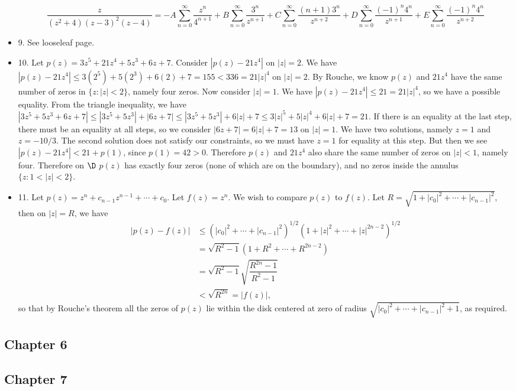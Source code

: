 \documentclass[11pt]{book}
\theoremstyle{definition}
\begin{document}
\begin{itemize}
\[
\dfrac{z}{(z^2+4)(z-3)^2(z-4)} =-A\sum_{n=0}^\infty \dfrac{z^n}{4^{n+1}}+ B\sum_{n=0}^\infty \dfrac{3^n}{z^{n+1}}+ C\sum_{n=0}^\infty\dfrac{(n+1)3^n}{z^{n+2}}+D\sum_{n=0}^\infty \dfrac{(-1)^n4^n}{z^{n+1}}+E\sum_{n=0}^\infty \dfrac{(-1)^n4^n}{z^{n+2}}
\]
\item 9. See looseleaf page.
\item 10. Let $p(z)=3z^5 +21z^4 +5z^3+6z +7$. Consider $|p(z)-21z^4|$ on $|z|=2$. We have $|p(z)-21z^4|\leq 3(2^5)+5(2^3)+6(2)+7=155<336=21|z|^4$ on $|z|=2$. By Rouche, we know $p(z)$ and $21z^4$ have the same number of zeros in $\{z:|z|<2\}$, namely four zeros. Now consider $|z|=1$. We have $|p(z)-21z^4|\leq 21=21|z|^4$, so we have a possible equality. From the triangle inequality, we have $|3z^5+5z^3+6z+7|\leq |3z^5+5z^3|+|6z+7|\leq |3z^5+5z^3|+6|z|+7\leq 3|z|^5+5|z|^4+6|z|+7=21$. If there is an equality at the last step, there must be an equality at all steps, so we consider $|6z+7|=6|z|+7=13$ on $|z|=1$. We have two solutions, namely $z=1$ and $z=-10/3$. The second solution does not satisfy our constraints, so we must have $z=1$ for equality at this step. But then we see $|p(z)-21z^4|<21+p(1)$, since $p(1)=42>0$. Therefore $p(z)$ and $21z^4$ also share the same number of zeros on $|z|<1$, namely four. Therefore on $\D$ $p(z)$ has exactly four zeros (none of which are on the boundary), and no zeros inside the annulus $\{z:1<|z|<2\}$.  
\item 11. Let $p(z)=z^n+c_{n-1}z^{n-1}+\cdots+c_0$. Let $f(z)=z^n$. We wish to compare $p(z)$ to $f(z)$. Let $R=\sqrt{1+|c_0|^2+\cdots+|c_{n-1}|^2}$, then on $|z|=R$, we have
\begin{align*}
|p(z)-f(z)|&\leq (|c_0|^2+\cdots+|c_{n-1}|^2)^{1/2}(1+|z|^2+\cdots+|z|^{2n-2})^{1/2} \\
&= \sqrt{R^2-1}(1+R^2+\cdots+R^{2n-2})\\
&= \sqrt{R^2-1}\sqrt{\dfrac{R^{2n}-1}{R^2-1}} \\
&< \sqrt{R^{2n}}=|f(z)|,
\end{align*}
so that by Rouche's theorem all the zeros of $p(z)$ lie within the disk centered at zero of radius $\sqrt{|c_0|^2+\cdots+|c_{n-1}|^2+1}$, as required.
\end{itemize}
\subsection{Chapter 6}
\subsection{Chapter 7}
\end{document}
